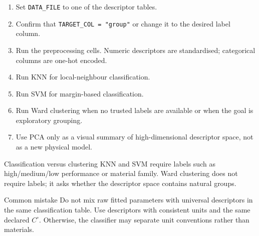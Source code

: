 \documentclass[journal=jacsat,manuscript=article]{achemso}
\begin{document}
\begin{enumerate}
	\item Set \texttt{DATA\_FILE} to one of the descriptor tables.
	\item Confirm that \texttt{TARGET\_COL = "group"} or change it to the
	desired label column.
	\item Run the preprocessing cells. Numeric descriptors are standardised;
	categorical columns are one-hot encoded.
	\item Run KNN for local-neighbour classification.
	\item Run SVM for margin-based classification.
	\item Run Ward clustering when no trusted labels are available or when the
	goal is exploratory grouping.
	\item Use PCA only as a visual summary of high-dimensional descriptor
	space, not as a new physical model.
\end{enumerate}

\begin{greenbox}{Classification versus clustering}
	KNN and SVM require labels such as high/medium/low performance or
	material family. Ward clustering does not require labels; it asks whether
	the descriptor space contains natural groups.
\end{greenbox}

\begin{redbox}{Common mistake}
	Do not mix raw fitted parameters with universal descriptors in the same
	classification table. Use descriptors with consistent units and the same
	declared \(C^\circ\). Otherwise, the classifier may separate unit
	conventions rather than materials.
\end{redbox}


% 
\end{document}
